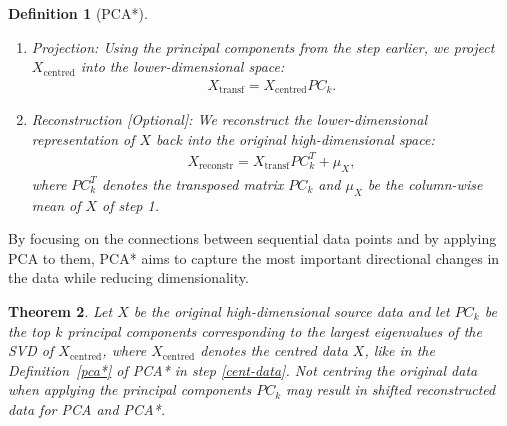 \documentclass[pdftex,12pt,a4paper]{report}
\newtheorem{definition}{Definition}[section]
\newtheorem{theorem}[definition]{Theorem}
\begin{document}
\begin{definition}[PCA*]
\begin{enumerate}
        Thus, we choose the top $k$ principal components, where $k$ denotes the desired number of dimensions for the lower-dimensional space.
        Let $PC_k$ be the matrix containing the chosen principal components as columns.
        \item Projection: Using the principal components from the step earlier, we project $X_\mathrm{centred}$ into the lower-dimensional space:
        \begin{align*}
            X_{\mathrm{transf}} = X_\mathrm{centred} PC_k.
        \end{align*}
        \item Reconstruction [Optional]: We reconstruct the lower-dimensional representation of $X$ back into the original high-dimensional space:
        \begin{align*}
            X_{\mathrm{reconstr}} = X_{\mathrm{transf}} PC_k^T + \mu_X,
        \end{align*}
        where $PC_k^T$ denotes the transposed matrix $PC_k$ and $\mu_X$ be the column-wise mean of $X$ of step 1.
    \end{enumerate}
\end{definition}

By focusing on the connections between sequential data points and by applying PCA to them, PCA* aims to capture the most important directional changes in the data while reducing dimensionality.

\begin{theorem} \label{data-uncentred}
    Let $X$ be the original high-dimensional source data and let $PC_k$ be the top $k$ principal components corresponding to the largest eigenvalues of the SVD of $X_{\mathrm{centred}}$, where $X_{\mathrm{centred}}$ denotes the centred data $X$, like in the Definition~\ref{pca*} of PCA* in step \ref{cent-data}.
    Not centring the original data when applying the principal components $PC_k$ may result in shifted reconstructed data for PCA and PCA*.
\end{theorem}
\end{document}
